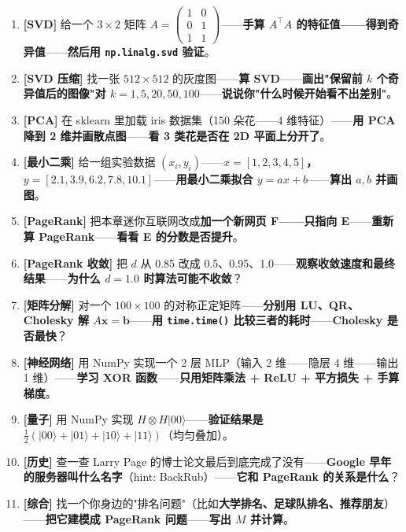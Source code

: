 \begin{enumerate}
\item \textbf{[SVD]} 给一个 $3 \times 2$ 矩阵 $A = \begin{pmatrix} 1 & 0 \\ 0 & 1 \\ 1 & 1 \end{pmatrix}$——\textbf{手算 $A^{\!\top} A$ 的特征值——得到奇异值}——\textbf{然后用 \texttt{np.linalg.svd} 验证}。
\item \textbf{[SVD 压缩]} 找一张 $512 \times 512$ 的灰度图——\textbf{算 SVD}——\textbf{画出"保留前 $k$ 个奇异值后的图像"对 $k = 1, 5, 20, 50, 100$}——\textbf{说说你"什么时候开始看不出差别"}。
\item \textbf{[PCA]} 在 sklearn 里加载 iris 数据集（150 朵花——4 维特征）——\textbf{用 PCA 降到 2 维并画散点图}——\textbf{看 3 类花是否在 2D 平面上分开了}。
\item \textbf{[最小二乘]} 给一组实验数据 $(x_i, y_i)$——\textbf{$x = [1, 2, 3, 4, 5]$，$y = [2.1, 3.9, 6.2, 7.8, 10.1]$}——\textbf{用最小二乘拟合 $y = ax + b$}——\textbf{算出 $a, b$ 并画图}。
\item \textbf{[PageRank]} 把本章迷你互联网改成\textbf{加一个新网页 F——只指向 E}——\textbf{重新算 PageRank}——\textbf{看看 E 的分数是否提升}。
\item \textbf{[PageRank 收敛]} 把 $d$ 从 0.85 改成 0.5、0.95、1.0——\textbf{观察收敛速度和最终结果}——\textbf{为什么 $d = 1.0$ 时算法可能不收敛}？
\item \textbf{[矩阵分解]} 对一个 $100 \times 100$ 的对称正定矩阵——\textbf{分别用 LU、QR、Cholesky 解 $A \bm{x} = \bm{b}$}——\textbf{用 \texttt{time.time()} 比较三者的耗时}——\textbf{Cholesky 是否最快}？
\item \textbf{[神经网络]} 用 NumPy 实现一个 2 层 MLP（输入 2 维——隐层 4 维——输出 1 维）——\textbf{学习 XOR 函数}——\textbf{只用矩阵乘法 + ReLU + 平方损失 + 手算梯度}。
\item \textbf{[量子]} 用 NumPy 实现 $H \otimes H |00\rangle$——\textbf{验证结果是 $\frac{1}{2}(|00\rangle + |01\rangle + |10\rangle + |11\rangle)$}（均匀叠加）。
\item \textbf{[历史]} 查一查 Larry Page 的博士论文最后到底完成了没有——\textbf{Google 早年的服务器叫什么名字}（hint: BackRub）——\textbf{它和 PageRank 的关系是什么}？
\item \textbf{[综合]} 找一个你身边的"排名问题"（比如\textbf{大学排名、足球队排名、推荐朋友}）——\textbf{把它建模成 PageRank 问题}——\textbf{写出 $M$ 并计算}。
\end{enumerate}

